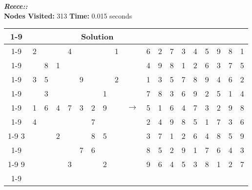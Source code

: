 \documentclass{article}
\begin{document}
\small\emph{\textbf{Reece::}}\\ \textbf{Nodes Visited:} 313 \textbf{Time:} 0.015 seconds\\
\begin{tabular}{||c|c|c||c|c|c||c|c|c|| c ||c|c|c||c|c|c||c|c|c||}
  \cmidrule{1-9} \cmidrule{11-19}
  \multicolumn{9}{|c|}{Problem} &                   & \multicolumn{9}{|c|}{Solution}   \\\cmidrule{1-9} \cmidrule{11-19} \morecmidrules \cmidrule{1-9} \cmidrule{11-19}
   & 2 &   &   & 4 &   &   &   & 1 &               & 6 & 2 & 7 & 3 & 4 & 5 & 9 & 8 & 1\\\cmidrule{1-9} \cmidrule{11-19}
   &   & 8 & 1 &   &   &   &   &   &               & 4 & 9 & 8 & 1 & 2 & 6 & 3 & 7 & 5\\\cmidrule{1-9} \cmidrule{11-19}
   & 3 & 5 &   &   & 9 &   &   & 2 &               & 1 & 3 & 5 & 7 & 8 & 9 & 4 & 6 & 2\\\cmidrule{1-9} \cmidrule{11-19} \morecmidrules \cmidrule{1-9} \cmidrule{11-19}
   &   & 3 &   &   &   &   & 1 &   &               & 7 & 8 & 3 & 6 & 9 & 2 & 5 & 1 & 4\\\cmidrule{1-9} \cmidrule{11-19}
   & 1 & 6 & 4 & 7 & 3 & 2 & 9 &   & $\rightarrow$ & 5 & 1 & 6 & 4 & 7 & 3 & 2 & 9 & 8\\\cmidrule{1-9} \cmidrule{11-19}
   & 4 &   &   &   &   & 7 &   &   &               & 2 & 4 & 9 & 8 & 5 & 1 & 7 & 3 & 6\\\cmidrule{1-9} \cmidrule{11-19} \morecmidrules \cmidrule{1-9} \cmidrule{11-19}
 3 &   &   & 2 &   &   & 8 & 5 &   &               & 3 & 7 & 1 & 2 & 6 & 4 & 8 & 5 & 9\\\cmidrule{1-9} \cmidrule{11-19}
   &   &   &   &   & 7 & 6 &   &   &               & 8 & 5 & 2 & 9 & 1 & 7 & 6 & 4 & 3\\\cmidrule{1-9} \cmidrule{11-19}
 9 &   &   &   & 3 &   &   & 2 &   &               & 9 & 6 & 4 & 5 & 3 & 8 & 1 & 2 & 7\\\cmidrule{1-9} \cmidrule{11-19} \morecmidrules \cmidrule{1-9} \cmidrule{11-19}

 \end{tabular}
\newpage
\end{document}
